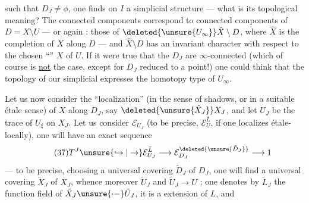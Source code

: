 
such that $D_J\ne\phi$,  one finds on $I$ a   \unsure{,} simplicial structure --- what is its topological meaning? The connected components correspond to connected components of $D=X\setminus U$ --- or again : those of $\deleted{\unsure{U_\infty}}\hat X\setminus D$, where $\hat X$ is the  completion of $X$ along $D$ --- and $\hat X\setminus D$ has an invariant character with respect to the chosen ``'' $X$ of $U$. If it were true that the  $D_J$ are $\infty$-connected (which of course is \uline{not} the case, except for $D_J$ reduced to a point!) one could think that the topology of our simplicial   expresses the homotopy type of $U_\infty$.

Let us now consider the ``localization''  (in the sense of shadows, or in a suitable étale sense) of $X$ along $D_J$, say $\deleted{\unsure{\hat X_J}}X_J$, and let $U_J$  be the trace of $U_\xi$ on $X_J$. Let us consider $\mathcal E_{U_J}$ (to be precise, $\mathcal E_U^{\bar L}$, if one localizes  étale-locally), one will have an exact sequence
\[
\tag{37}
T^J\unsure{\hookrightarrow|\to}\mathcal E_{U_J}^{\bar L}\longrightarrow\mathcal E_{D_J}^{\deleted{\unsure{\tilde D_J}}}\longrightarrow1
\]
--- to be precise, choosing a universal covering $\tilde D_J$ of $D_J$, one will find a universal covering  $\tilde X_J$ of $X_J$, whence moreover $\tilde U_J$ and $\tilde U_J\longrightarrow U$ ;  one denotes by $\tilde L_J$ the function field of $\tilde X_J\unsure{\mathrel{\cdot-}}\tilde U_J$, it is a  extension of $L$, and




